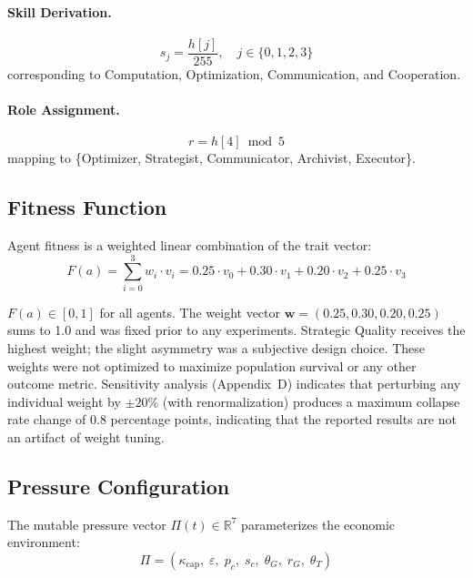 \documentclass[11pt,a4paper]{article}
\begin{document}
\paragraph{Skill Derivation.}
\begin{equation}
  s_j = \frac{h[j]}{255}, \quad j \in \{0, 1, 2, 3\}
\end{equation}
corresponding to Computation, Optimization, Communication, and Cooperation.

\paragraph{Role Assignment.}
\begin{equation}
  r = h[4] \bmod 5
\end{equation}
mapping to \{Optimizer, Strategist, Communicator, Archivist, Executor\}.

\subsection{Fitness Function}

Agent fitness is a weighted linear combination of the trait vector:
\begin{equation}
  F(a) = \sum_{i=0}^{3} w_i \cdot v_i = 0.25 \cdot v_0 + 0.30 \cdot v_1 + 0.20 \cdot v_2 + 0.25 \cdot v_3
\end{equation}

$F(a) \in [0, 1]$ for all agents. The weight vector $\mathbf{w} = (0.25, 0.30, 0.20, 0.25)$ sums to 1.0 and was fixed prior to any experiments. Strategic Quality receives the highest weight; the slight asymmetry was a subjective design choice. These weights were not optimized to maximize population survival or any other outcome metric. Sensitivity analysis (Appendix~D) indicates that perturbing any individual weight by $\pm 20\%$ (with renormalization) produces a maximum collapse rate change of 0.8 percentage points, indicating that the reported results are not an artifact of weight tuning.

\subsection{Pressure Configuration}

The mutable pressure vector $\Pi(t) \in \mathbb{R}^7$ parameterizes the economic environment:
\begin{equation}
  \Pi = (\kappa_{\text{cap}},\; \varepsilon,\; p_c,\; s_c,\; \theta_G,\; r_G,\; \theta_T)
\end{equation}
\end{document}
